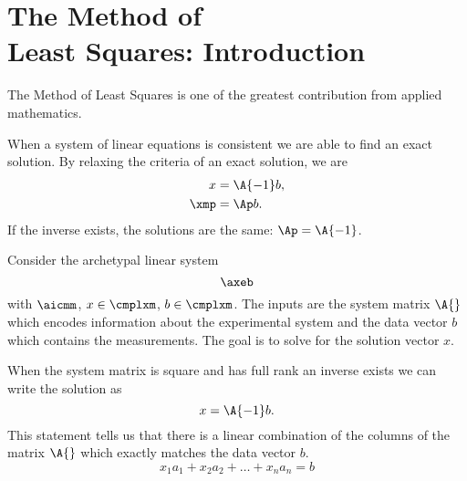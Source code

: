 \chapter[The Method of Least Squares: Introduction]{The Method of \\Least Squares: Introduction}

The Method of Least Squares is one of the greatest contribution from applied mathematics.

When a system of linear equations is consistent we are able to find an exact solution.
By relaxing the criteria of an exact solution, we are 
\begin{equation}
  \begin{split}
    x    &= \A{-1} b , \\
    \xmp &= \Ap b .
  \end{split}
\end{equation}
If the inverse exists, the solutions are the same: $\Ap = \A{-1}$.

Consider the archetypal linear system
\begin{equation}
  \axeb
  \label{eqn:axeb}
\end{equation}
with $\aicmm$, $x\in\cmplxm$, $b\in\cmplxm$. The inputs are the system matrix $\A{}$ which encodes information about the experimental system and the data vector $b$ which contains the measurements. The goal is to solve for the solution vector $x$.

When the system matrix is square and has full rank an inverse exists we can write the solution as
\begin{equation}
  x = \A{-1} b.
\end{equation}
This statement tells us that there is a linear combination of the columns of the matrix $\A{}$ which exactly matches the data vector $b$.
\begin{equation}
  x_{1} a_{1} + x_{2} a_{2} + \dots + x_{n} a_{n} = b
\end{equation}







\endinput